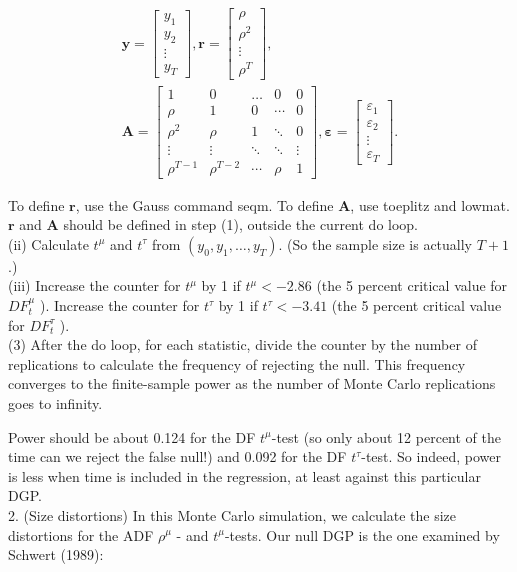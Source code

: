 \documentclass[10pt]{article}
\begin{document}
$$
\begin{gathered}
\mathbf{y}=\left[\begin{array}{c}
y_{1} \\
y_{2} \\
\vdots \\
y_{T}
\end{array}\right], \mathbf{r}=\left[\begin{array}{c}
\rho \\
\rho^{2} \\
\vdots \\
\rho^{T}
\end{array}\right], \\
\mathbf{A}=\left[\begin{array}{ccccc}
1 & 0 & \ldots & 0 & 0 \\
\rho & 1 & 0 & \cdots & 0 \\
\rho^{2} & \rho & 1 & \ddots & 0 \\
\vdots & \vdots & \ddots & \ddots & \vdots \\
\rho^{T-1} & \rho^{T-2} & \cdots & \rho & 1
\end{array}\right], \boldsymbol{\varepsilon}=\left[\begin{array}{c}
\varepsilon_{1} \\
\varepsilon_{2} \\
\vdots \\
\varepsilon_{T}
\end{array}\right] .
\end{gathered}
$$

To define $\mathbf{r}$, use the Gauss command seqm. To define $\mathbf{A}$, use toeplitz and lowmat. $\mathbf{r}$ and $\mathbf{A}$ should be defined in step (1), outside the current do loop.\\
(ii) Calculate $t^{\mu}$ and $t^{\tau}$ from $\left(y_{0}, y_{1}, \ldots, y_{T}\right)$. (So the sample size is actually $T+1$.)\\
(iii) Increase the counter for $t^{\mu}$ by 1 if $t^{\mu}<-2.86$ (the 5 percent critical value for $D F_{t}^{\mu}$ ). Increase the counter for $t^{\tau}$ by 1 if $t^{\tau}<-3.41$ (the 5 percent critical value for $D F_{t}^{\tau}$ ).\\
(3) After the do loop, for each statistic, divide the counter by the number of replications to calculate the frequency of rejecting the null. This frequency converges to the finite-sample power as the number of Monte Carlo replications goes to infinity.

Power should be about 0.124 for the DF $t^{\mu}$-test (so only about 12 percent of the time can we reject the false null!) and 0.092 for the DF $t^{\tau}$-test. So indeed, power is less when time is included in the regression, at least against this particular DGP.\\
2. (Size distortions) In this Monte Carlo simulation, we calculate the size distortions for the ADF $\rho^{\mu}$ - and $t^{\mu}$-tests. Our null DGP is the one examined by Schwert (1989):
\end{document}
